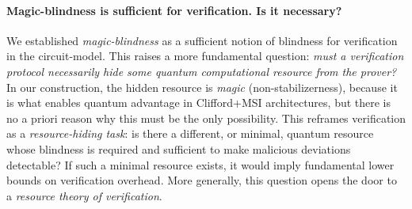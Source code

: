 \paragraph{Magic-blindness is sufficient for verification. Is it necessary?}
We established \emph{magic-blindness} as a sufficient notion of blindness for
 verification in the circuit-model. This raises a more fundamental question: \emph{must a verification protocol necessarily hide some quantum computational resource from the prover?} In our construction, the hidden resource is \emph{magic} (non-stabilizerness), because it is what enables quantum advantage in Clifford+MSI architectures, but there is no a priori reason why this must be the only possibility. This reframes verification as a \emph{resource-hiding task}: is there a different, or minimal, quantum resource whose blindness is required and sufficient to make malicious deviations detectable? If such a minimal resource exists, it would imply fundamental lower bounds on verification overhead. More generally, this question opens the door to a \emph{resource theory of verification}.
